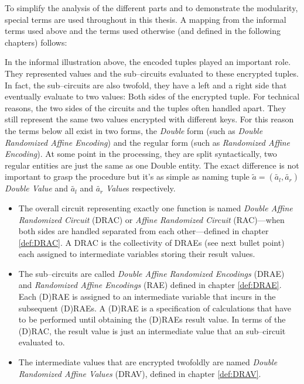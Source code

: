 To simplify the analysis of the different parts and to demonstrate the
modularity, special terms are used throughout in this thesis. A mapping from the
informal terms used above and the terms used otherwise (and defined in the
following chapters) follows:

In the informal illustration above, the encoded tuples played an important role.
They represented values and the sub--circuits evaluated to these encrypted
tuples. In fact, the sub--circuits are also twofold, they have a left and a
right side that eventually evaluate to two values: Both sides of the encrypted
tuple. For technical reasons, the two sides of the circuits and the tuples often
handled apart. They still represent the same two values encrypted with
different keys. For this reason the terms below all exist in two forms, the
\emph{Double} form (such as \emph{Double Randomized Affine Encoding}) and the
regular form (such as \emph{Randomized Affine Encoding}). At some point in the
processing, they are split syntactically, two regular entities are just the same
as one Double entity. The exact difference is not important to grasp the
procedure but it's as simple as naming tuple $\widetilde{a} = (\widetilde{a_l},
\widetilde{a_r})$ \emph{Double Value} and $\widetilde{a_l}$ and
$\widetilde{a_r}$ \emph{Value}s respectively.

\begin{itemize}

  \item The overall circuit representing exactly one function is named
    \emph{Double Affine Randomized Circuit} (DRAC) or \emph{Affine Randomized
    Circuit} (RAC)---when both sides are handled separated from each
    other---defined in chapter \ref{def:DRAC}. A DRAC is the collectivity of
    DRAEs (see next bullet point) each assigned to intermediate variables
    storing their result values.

  \item The sub--circuits are called \emph{Double Affine Randomized Encodings}
    (DRAE) and \emph{Randomized Affine Encodings} (RAE) defined in chapter
    \ref{def:DRAE}. Each (D)RAE is assigned to an intermediate variable that
    incurs in the subsequent (D)RAEs. A (D)RAE is a specification of
    calculations that have to be performed until obtaining the (D)RAEs result
    value. In terms of the (D)RAC, the result value is just an intermediate
    value that an sub--circuit evaluated to.

  \item The intermediate values that are encrypted twofoldly are named
    \emph{Double Randomized Affine Values} (DRAV), defined in chapter
    \ref{def:DRAV}.

\end{itemize}


